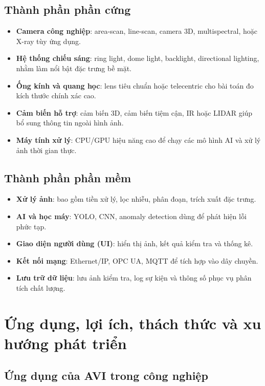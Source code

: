 \subsection*{Thành phần phần cứng}

\begin{itemize}
    \item \textbf{Camera công nghiệp}: area-scan, line-scan, camera 3D, multispectral, hoặc X-ray tùy ứng dụng.
    \item \textbf{Hệ thống chiếu sáng}: ring light, dome light, backlight, directional lighting, nhằm làm nổi bật đặc trưng bề mặt.
    \item \textbf{Ống kính và quang học}: lens tiêu chuẩn hoặc telecentric cho bài toán đo kích thước chính xác cao.
    \item \textbf{Cảm biến hỗ trợ}: cảm biến 3D, cảm biến tiệm cận, IR hoặc LIDAR giúp bổ sung thông tin ngoài hình ảnh.
    \item \textbf{Máy tính xử lý}: CPU/GPU hiệu năng cao để chạy các mô hình AI và xử lý ảnh thời gian thực.
\end{itemize}

\subsection*{Thành phần phần mềm}

\begin{itemize}
    \item \textbf{Xử lý ảnh}: bao gồm tiền xử lý, lọc nhiễu, phân đoạn, trích xuất đặc trưng.
    \item \textbf{AI và học máy}: YOLO, CNN, anomaly detection dùng để phát hiện lỗi phức tạp.
    \item \textbf{Giao diện người dùng (UI)}: hiển thị ảnh, kết quả kiểm tra và thống kê.
    \item \textbf{Kết nối mạng}: Ethernet/IP, OPC UA, MQTT để tích hợp vào dây chuyền.
    \item \textbf{Lưu trữ dữ liệu}: lưu ảnh kiểm tra, log sự kiện và thông số phục vụ phân tích chất lượng.
\end{itemize}


\section{Ứng dụng, lợi ích, thách thức và xu hướng phát triển}

\subsection*{Ứng dụng của AVI trong công nghiệp}

